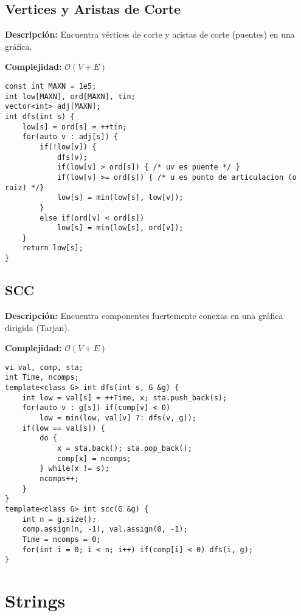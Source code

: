 \documentclass[twocolumn]{article}
\begin{document}
\subsection{Vertices y Aristas de Corte}
\begin{footnotesize}{\bf Descripción: } Encuentra vértices de corte y aristas de corte (puentes) en una gráfica.


{\bf Complejidad: } $\mathcal{O}(V + E)$
\end{footnotesize}\lstset{basicstyle=\footnotesize\ttfamily,breaklines=true,tabsize=2,language=C++,frame=leftline, numbers=left, numberstyle=\tiny, numbersep=5pt}
\begin{lstlisting}
const int MAXN = 1e5;
int low[MAXN], ord[MAXN], tin;
vector<int> adj[MAXN];
int dfs(int s) {
	low[s] = ord[s] = ++tin;
	for(auto v : adj[s]) {
		if(!low[v]) {
			dfs(v);
			if(low[v] > ord[s]) { /* uv es puente */ }
			if(low[v] >= ord[s]) { /* u es punto de articulacion (o raiz) */}
			low[s] = min(low[s], low[v]);
		}
		else if(ord[v] < ord[s])
			low[s] = min(low[s], ord[v]);
	}
	return low[s];
}
\end{lstlisting}
\subsection{SCC}
\begin{footnotesize}{\bf Descripción: } Encuentra componentes fuertemente conexas en una gráfica dirigida (Tarjan).


{\bf Complejidad: } $\mathcal{O}(V + E)$
\end{footnotesize}\lstset{basicstyle=\footnotesize\ttfamily,breaklines=true,tabsize=2,language=C++,frame=leftline, numbers=left, numberstyle=\tiny, numbersep=5pt}
\begin{lstlisting}
vi val, comp, sta;
int Time, ncomps;
template<class G> int dfs(int s, G &g) {
	int low = val[s] = ++Time, x; sta.push_back(s);
	for(auto v : g[s]) if(comp[v] < 0)
		low = min(low, val[v] ?: dfs(v, g));
	if(low == val[s]) {
		do {
			x = sta.back(); sta.pop_back();
			comp[x] = ncomps;
		} while(x != s);
		ncomps++;
	}
}
template<class G> int scc(G &g) {
	int n = g.size();
	comp.assign(n, -1), val.assign(0, -1);
	Time = ncomps = 0;
	for(int i = 0; i < n; i++) if(comp[i] < 0) dfs(i, g);
}
\end{lstlisting}
\section{Strings}
\end{document}

